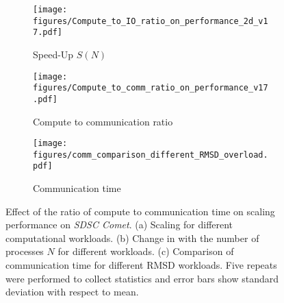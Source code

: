 \begin{figure}[!htb]
  \centering
  \begin{subfigure} {.33\textwidth}
    \texttt{[image: figures/Compute\_to\_IO\_ratio\_on\_performance\_2d\_v17.pdf]}
    \caption{Speed-Up $S(N)$}
    \label{fig:S1_tcomp_tcomm_effect}
  \end{subfigure}
  \hfill
  \begin{subfigure}{.3\textwidth}
    \texttt{[image: figures/Compute\_to\_comm\_ratio\_on\_performance\_v17.pdf]}
    \captionsetup{format=hang}
    \caption{Compute to communication ratio \Rcompcomm}
    \label{fig:tcomp_tcomm_ratio}
  \end{subfigure}
  \hfill
  \begin{subfigure}{.33\textwidth}
    \texttt{[image: figures/comm\_comparison\_different\_RMSD\_overload.pdf]}
    \caption{Communication time \tcomm}
    \label{fig:Comm_time_tcomp_tcomm_effect}
  \end{subfigure}
  \caption{Effect of the ratio of compute to communication time \Rcompcomm on scaling performance on \emph{SDSC Comet}.
    (a) Scaling for different computational workloads.
    (b) Change in \Rcompcomm with the number of processes $N$ for different workloads. 
    (c) Comparison of communication time for different RMSD workloads.
    Five repeats were performed to collect statistics and error bars show standard deviation with respect to mean.}
  \label{fig:tcom_tcomm_effect}
\end{figure}

